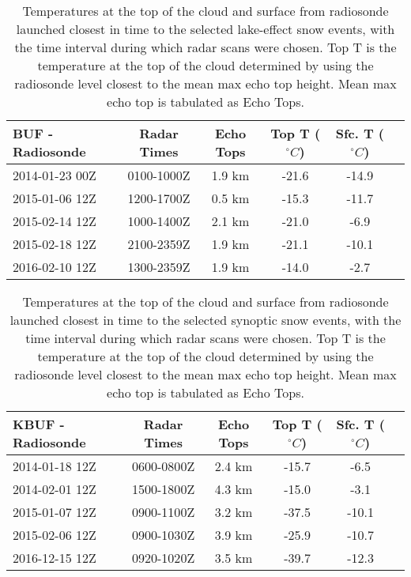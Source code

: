 \begin{table}[H]
    \caption{Temperatures at the top of the cloud and surface from radiosonde launched closest in time to the selected lake-effect snow events, with the time interval during which radar scans were chosen. Top T is the temperature at the top of the cloud determined by using the radiosonde level closest to the mean max echo top height. Mean max echo top is tabulated as Echo Tops.}\label{eventslake}
    \begin{center}
    \begin{tabular}{|l|c|c|c|c|c|}
    \hline
     BUF - Radiosonde & Radar Times & Echo Tops & Top T ($^{\circ}C$) & Sfc. T ($^{\circ}C$)\\
    \hline\hline
    2014-01-23 00Z & 0100-1000Z & 1.9 km & -21.6 & -14.9 \\
    \hline
    2015-01-06 12Z & 1200-1700Z & 0.5 km & -15.3 & -11.7 \\
    \hline
    2015-02-14 12Z & 1000-1400Z & 2.1 km & -21.0 & -6.9 \\
    \hline
    2015-02-18 12Z & 2100-2359Z & 1.9 km & -21.1 & -10.1 \\
    \hline
    2016-02-10 12Z & 1300-2359Z & 1.9 km & -14.0 & -2.7 \\
    \hline
    \end{tabular}
    \end{center}
\end{table}

\begin{table}[H]
    \caption{Temperatures at the top of the cloud and surface from radiosonde launched closest in time to the selected synoptic snow events, with the time interval during which radar scans were chosen. Top T is the temperature at the top of the cloud determined by using the radiosonde level closest to the mean max echo top height. Mean max echo top is tabulated as Echo Tops.}\label{synopticevents}
    \begin{center}
    \begin{tabular}{|l|c|c|c|c|c|}
    \hline
     KBUF - Radiosonde & Radar Times & Echo Tops & Top T ($^{\circ}C$) & Sfc. T ($^{\circ}C$)\\
    \hline\hline
    2014-01-18 12Z & 0600-0800Z & 2.4 km & -15.7 & -6.5 \\
    \hline
    2014-02-01 12Z & 1500-1800Z & 4.3 km & -15.0 & -3.1 \\
    \hline
    2015-01-07 12Z & 0900-1100Z & 3.2 km & -37.5 & -10.1 \\
    \hline
    2015-02-06 12Z & 0900-1030Z & 3.9 km & -25.9 & -10.7 \\
    \hline
    2016-12-15 12Z & 0920-1020Z & 3.5 km & -39.7 & -12.3 \\
    \hline
    \end{tabular}
    \end{center}
\end{table}
